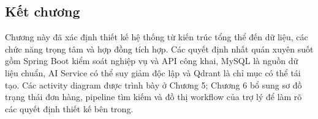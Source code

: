 \subsection*{Kết chương}

Chương này đã xác định thiết kế hệ thống từ kiến trúc tổng thể đến dữ liệu, các chức năng trọng tâm và hợp đồng tích hợp. Các quyết định nhất quán xuyên suốt gồm Spring Boot kiểm soát nghiệp vụ và API công khai, MySQL là nguồn dữ liệu chuẩn, AI Service có thể suy giảm độc lập và Qdrant là chỉ mục có thể tái tạo. Các activity diagram được trình bày ở Chương 5; Chương 6 bổ sung sơ đồ trạng thái đơn hàng, pipeline tìm kiếm và đồ thị workflow của trợ lý để làm rõ các quyết định thiết kế bên trong.
